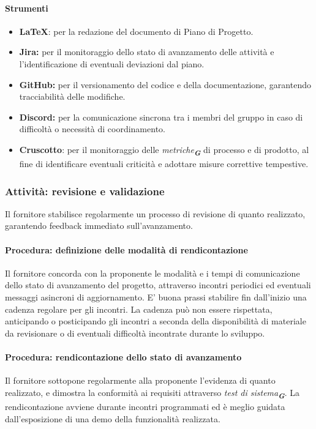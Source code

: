 \documentclass[a4paper,12pt]{article}
\newcommand{\glossario}[1]{\textit{#1}\textsubscript{\textbf{\textit{\textcolor{lightblack}{G}}}}}
\begin{document}
\paragraph{Strumenti}
\begin{itemize}
    \item \textbf{\LaTeX}: per la redazione del documento di Piano di Progetto.
    \item \textbf{Jira:} per il monitoraggio dello stato di avanzamento delle attività e l'identificazione di eventuali deviazioni dal piano.
    \item \textbf{GitHub:} per il versionamento del codice e della documentazione, garantendo tracciabilità delle modifiche.
    \item \textbf{Discord:} per la comunicazione sincrona tra i membri del gruppo in caso di difficoltà o necessità di coordinamento.
    \item \textbf{Cruscotto}: per il monitoraggio delle \glossario{metriche} di processo e di prodotto, al fine di identificare eventuali criticità e adottare misure correttive tempestive.
\end{itemize}

\subsubsection{Attività: revisione e validazione}
Il fornitore stabilisce regolarmente un processo di revisione di quanto
realizzato, garantendo feedback immediato sull'avanzamento.

\paragraph{Procedura: definizione delle modalità di rendicontazione}
Il fornitore concorda con la proponente le modalità e i tempi di comunicazione
dello stato di avanzamento del progetto, attraverso incontri periodici ed
eventuali messaggi asincroni di aggiornamento. E' buona prassi stabilire fin
dall'inizio una cadenza regolare per gli incontri. La cadenza può non essere
rispettata, anticipando o posticipando gli incontri a seconda della
disponibilità di materiale da revisionare o di eventuali difficoltà incontrate
durante lo sviluppo.

\paragraph{Procedura: rendicontazione dello stato di avanzamento}
Il fornitore sottopone regolarmente alla proponente l'evidenza di quanto
realizzato, e dimostra la conformità ai requisiti attraverso \glossario{test di sistema}.
La rendicontazione avviene durante incontri programmati ed è meglio guidata
dall'esposizione di una demo della funzionalità realizzata.
\end{document}
